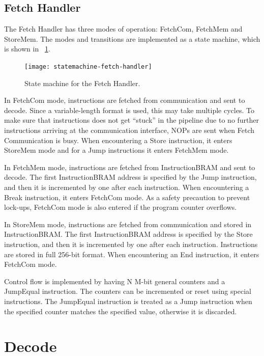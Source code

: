 \subsection{Fetch Handler}

The Fetch Handler has three modes of operation: FetchCom, FetchMem and StoreMem.
The modes and transitions are implemented as a state machine, which is shown in \figurename~\ref{fig:statemachine-fetch-handler}.

\begin{figure}[!ht]
    \centering
    \texttt{[image: statemachine-fetch-handler]}
    \caption[Fetch Handler state machine]{State machine for the Fetch Handler.}
    \label{fig:statemachine-fetch-handler}
\end{figure}

In FetchCom mode, instructions are fetched from communication and sent to decode.
Since a variable-length format is used, this may take multiple cycles.
To make sure that instructions does not get ``stuck'' in the pipeline due to no further instructions arriving at the communication interface, NOPs are sent when Fetch Communication is busy.
When encountering a Store instruction, it enters StoreMem mode and for a Jump instructions it enters FetchMem mode.

In FetchMem mode, instructions are fetched from InstructionBRAM and sent to decode.
The first InstructionBRAM address is specified by the Jump instruction, and then it is incremented by one after each instruction.
When encountering a Break instruction, it enters FetchCom mode.
As a safety precaution to prevent lock-ups, FetchCom mode is also entered if the program counter overflows.

In StoreMem mode, instructions are fetched from communication and stored in InstructionBRAM.
The first InstructionBRAM address is specified by the Store instruction, and then it is incremented by one after each instruction.
Instructions are stored in full 256-bit format.
When encountering an End instruction, it enters FetchCom mode.

Control flow is implemented by having N M-bit general counters and a JumpEqual instruction.
The counters can be incremented or reset using special instructions.
The JumpEqual instruction is treated as a Jump instruction when the specified counter matches the specified value, otherwise it is discarded.


\section{Decode}

